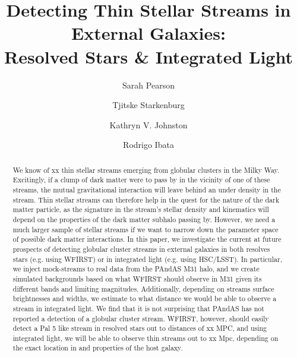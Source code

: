 \documentclass[twocolumn]{aastex62}
\begin{document}
\sloppy\sloppypar\raggedbottom\frenchspacing %
\title{Detecting Thin Stellar Streams in External Galaxies:\\ Resolved Stars \& Integrated Light}


 \author{Sarah Pearson}

\author{Tjitske Starkenburg}

\author{Kathryn V. Johnston}

\author{Rodrigo Ibata}

\begin{abstract}\noindent 
We know of xx thin stellar streams emerging from globular clusters in the Milky Way. Excitingly, if a clump of dark matter were to pass by in the vicinity of one of these streams, the mutual gravitational interaction will leave behind an under density in the stream. Thin stellar streams can therefore help in the quest for the nature of the dark matter particle, as the signature in the stream's stellar density and kinematics will depend on the properties of the dark matter subhalo passing by. However, we need a much larger sample of stellar streams if we want to narrow down the parameter space of possible dark matter interactions. In this paper, we investigate the current at future prospects of detecting globular cluster streams in external galaxies in both resolves stars (e.g. using WFIRST) or in integrated light (e.g. using HSC/LSST). In particular, we inject mock-streams to real data from the PAndAS M31 halo, and we create simulated backgrounds based on what WFIRST should observe in M31 given its different bands and limiting magnitudes. Additionally, depending on streams surface brightnesses and widths, we estimate to what distance we would be able to observe a stream in integrated light.  We find that it is not surprising that PAndAS has not reported a detection of a globular cluster stream. WFIRST, however, should easily detect a Pal 5 like stream in resolved stars out to distances of xx MPC, and using integrated light, we will be able to observe thin streams out to xx Mpc, depending on the exact location in and properties of the host galaxy. 

\end{abstract}
\end{document}
